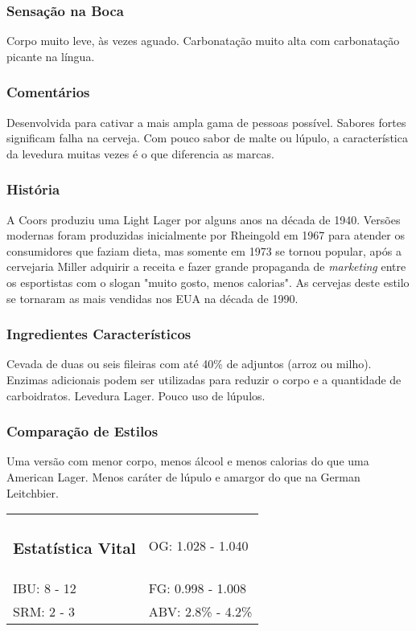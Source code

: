 \begin{multicols}{2}
\subsubsection*{Sensação na Boca}

Corpo muito leve, às vezes aguado. Carbonatação muito alta com carbonatação picante na língua.

\subsubsection*{Comentários}

Desenvolvida para cativar a mais ampla gama de pessoas possível. Sabores fortes significam falha na cerveja. Com pouco sabor de malte ou lúpulo, a característica da levedura muitas vezes é o que diferencia as marcas.

\subsubsection*{História}

A Coors produziu uma Light Lager por alguns anos na década de 1940. Versões modernas foram produzidas inicialmente por Rheingold em 1967 para atender os consumidores que faziam dieta, mas somente em 1973 se tornou popular, após a cervejaria Miller adquirir a receita e fazer grande propaganda de \textit{marketing} entre os esportistas com o slogan "muito gosto, menos calorias". As cervejas deste estilo se tornaram as mais vendidas nos EUA na década de 1990.

\subsubsection*{Ingredientes Característicos}

Cevada de duas ou seis fileiras com até 40\% de adjuntos (arroz ou milho). Enzimas adicionais podem ser utilizadas para reduzir o corpo e a quantidade de carboidratos. Levedura Lager. Pouco uso de lúpulos.

\subsubsection*{Comparação de Estilos}

Uma versão com menor corpo, menos álcool e menos calorias do que uma American Lager. Menos caráter de lúpulo e amargor do que na German Leitchbier.

\begin{tabular}{@{}ll@{}}
\subsubsection*{Estatística Vital} & OG: 1.028 - 1.040 \\
IBU: 8 - 12 & FG: 0.998 - 1.008 \\
SRM: 2 - 3  & ABV: 2.8\% - 4.2\%
\end{tabular}


\end{multicols}
